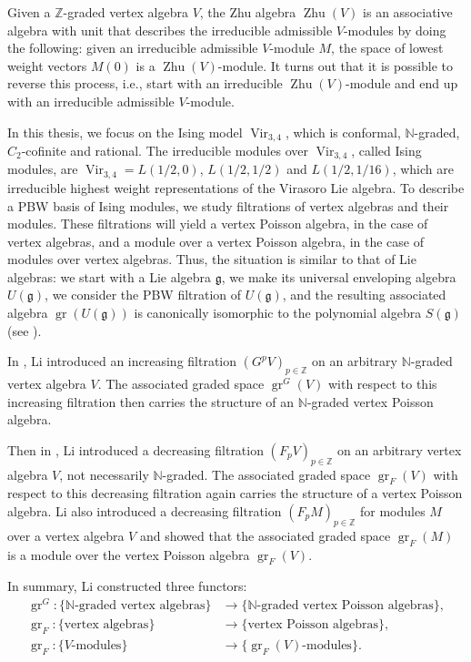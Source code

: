 \documentclass[a4paper, 12pt, reqno]{amsart}
\theoremstyle{remark}
\DeclareMathOperator{\Vir}{Vir}
\DeclareMathOperator{\gr}{gr}
\DeclareMathOperator{\Zhu}{Zhu}
\begin{document}
Given a $\mathbb{Z}$-graded vertex algebra $V$, the Zhu algebra $\Zhu(V)$ is an associative algebra with unit that describes the irreducible admissible $V$-modules by doing the following: given an irreducible admissible $V$-module $M$, the space of lowest weight vectors $M(0)$ is a $\Zhu(V)$-module.
It turns out that it is possible to reverse this process, i.e., start with an irreducible $\Zhu(V)$-module and end up with an irreducible admissible $V$-module.

In this thesis, we focus on the Ising model $\Vir_{3, 4}$, which is conformal, $\mathbb{N}$-graded, $C_2$-cofinite and rational.
The irreducible modules over $\Vir_{3, 4}$, called Ising modules, are $\Vir_{3, 4} = L(1/2, 0)$, $L(1/2, 1/2)$ and $L(1/2, 1/16)$, which are irreducible highest weight representations of the Virasoro Lie algebra.
To describe a PBW basis of Ising modules, we study filtrations of vertex algebras and their modules.
These filtrations will yield a vertex Poisson algebra, in the case of vertex algebras, and a module over a vertex Poisson algebra, in the case of modules over vertex algebras.
Thus, the situation is similar to that of Lie algebras: we start with a Lie algebra $\mathfrak{g}$, we make its universal enveloping algebra $U(\mathfrak{g})$, we consider the PBW filtration of $U(\mathfrak{g})$, and the resulting associated algebra $\gr(U(\mathfrak{g}))$ is canonically isomorphic to the polynomial algebra $S(\mathfrak{g})$ (see ).

In \cite{li_vertex_2004}, Li introduced an increasing filtration $(G^pV)_{p \in \mathbb{Z}}$ on an arbitrary $\mathbb{N}$-graded vertex algebra $V$.
The associated graded space $\gr^G(V)$ with respect to this increasing filtration then carries the structure of an $\mathbb{N}$-graded vertex Poisson algebra.

Then in \cite{li_abelianizing_2005}, Li introduced a decreasing filtration $(F_pV)_{p \in \mathbb{Z}}$ on an arbitrary vertex algebra $V$, not necessarily $\mathbb{N}$-graded.
The associated graded space $\gr_F(V)$ with respect to this decreasing filtration again carries the structure of a vertex Poisson algebra.
Li also introduced a decreasing filtration $(F_pM)_{p \in \mathbb{Z}}$ for modules $M$ over a vertex algebra $V$ and showed that the associated graded space $\gr_F(M)$ is a module over the vertex Poisson algebra $\gr_F(V)$.

In summary, Li constructed three functors:
\begin{align*}
  \gr^G: \{\text{$\mathbb{N}$-graded vertex algebras}\} &\to \{\text{$\mathbb{N}$-graded vertex Poisson algebras}\}, \\
  \gr_F: \{\text{vertex algebras}\} &\to \{\text{vertex Poisson algebras}\}, \\
  \gr_F: \{\text{$V$-modules}\} &\to \{\text{$\gr_F(V)$-modules}\}.
\end{align*}
\end{document}
